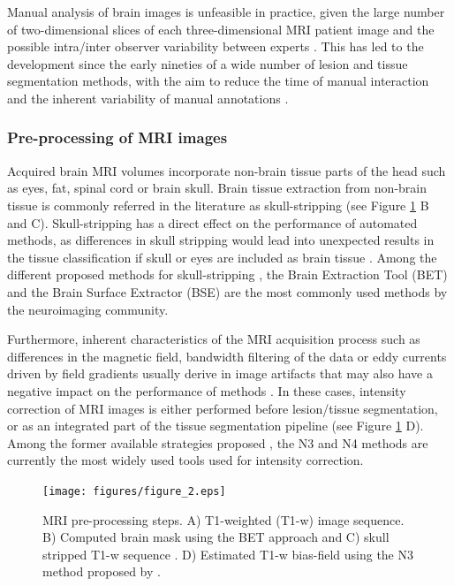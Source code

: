 Manual analysis of brain images is unfeasible in practice, given the large number of two-dimensional slices of each three-dimensional MRI patient image and the possible intra/inter observer variability between experts \cite{Cabezas2011}. This has led to the development since the early nineties of a wide number of lesion and tissue segmentation methods, with the aim to reduce the time of manual interaction and the inherent variability of manual annotations \cite{Cline1990, Gerig1992, Kapur1996}. 


\subsubsection{Pre-processing of MRI images}
Acquired brain MRI volumes incorporate non-brain tissue parts of the head such as eyes, fat, spinal cord or brain skull. Brain tissue extraction from non-brain tissue is commonly referred in the literature as skull-stripping (see Figure \ref{preprocessing_mri} B and C). Skull-stripping has a direct effect on the performance of automated methods, as differences in skull stripping would lead into unexpected results in the tissue classification if skull or eyes are included as brain tissue \cite{Acosta-Cabronero2008, Popescu2012}. Among the different proposed methods for skull-stripping \cite{Acosta-Cabronero2008, Lee2003, Roura2014}, the Brain Extraction Tool (BET) \cite{Smith2002} and the Brain Surface Extractor (BSE) \cite{Shattuck2001} are the most commonly used methods by the neuroimaging community.

Furthermore, inherent characteristics of the MRI acquisition process such as differences in the magnetic field, bandwidth filtering of the data or eddy currents driven by field gradients usually derive in image artifacts that may also have a negative impact on the performance of methods \cite{Simmons1994}. In these cases, intensity correction of MRI images is either performed before lesion/tissue segmentation, or as an integrated part of the tissue segmentation pipeline  (see Figure \ref{preprocessing_mri} D). Among the former available strategies proposed \cite{Arnold2001,Hou2006}, the N3 \cite{Sled1998} and N4 \cite{Tustison2010} methods are currently the most widely used tools used for intensity correction. 


\begin{figure}[top]
  \begin{center}
    \texttt{[image: figures/figure\_2.eps]}
  \end{center}
    \caption[MRI pre-processing steps]{MRI pre-processing steps. A) T1-weighted (T1-w) image sequence. B) Computed brain mask using the BET approach \cite{Smith2002} and C) skull stripped T1-w sequence  . D) Estimated T1-w bias-field using the N3 method proposed by \cite{Sled1998}.}
    \label{preprocessing_mri}
\end{figure}

